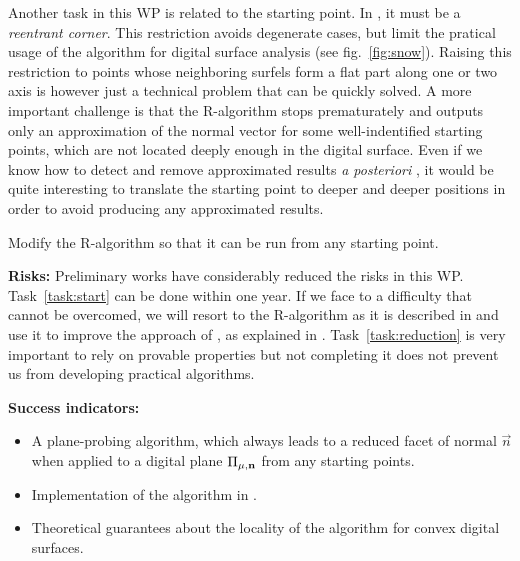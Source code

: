 Another task in this WP is related to the starting point. In \cite{LPRJMIV2017},
it must be a \emph{reentrant corner}. This restriction avoids degenerate cases, but
limit the pratical usage of the algorithm for digital surface analysis
(see fig.~\ref{fig:snow}). Raising this restriction to points whose neighboring
surfels form a flat part along one or two axis is however just a technical
problem that can be quickly solved. A more important challenge is that the R-algorithm
stops prematurately and outputs only an approximation of the normal vector for some
well-indentified starting points, which are not located deeply enough in the digital
surface. Even if we know how to detect and remove approximated results
\emph{a posteriori} \cite{LPRJMIV2017}, it would be quite interesting to translate
the starting point to deeper and deeper positions in order to avoid producing any
approximated results.

\begin{Task}
  \label{task:start}
  Modify the R-algorithm so that it can be run from any starting point. 
\end{Task}


\noindent\textbf{Risks:}
Preliminary works have considerably reduced the risks in this WP. Task~\ref{task:start}
can be done within one year. If we face to a difficulty that cannot be overcomed,
we will resort to the R-algorithm as it is described in \cite{LPRJMIV2017} and use it
to improve the approach of \citeauthor*{Charrier2011} \cite{Charrier2011}, as explained
in . Task~\ref{task:reduction} is very important to rely on provable
properties but not completing it does not prevent us from developing practical algorithms.

\noindent\textbf{Success indicators:}
\begin{itemize}
    \item A plane-probing algorithm, which always leads to a
      reduced facet of normal $\vec{n}$ when applied to a digital
      plane $\Pi_{\mu,\mathbf{n}}$ from any starting points.
    \item Implementation of the algorithm in \DGtal.   
    \item Theoretical guarantees about the locality of the algorithm
      for convex digital surfaces.  
\end{itemize}

\newpage

